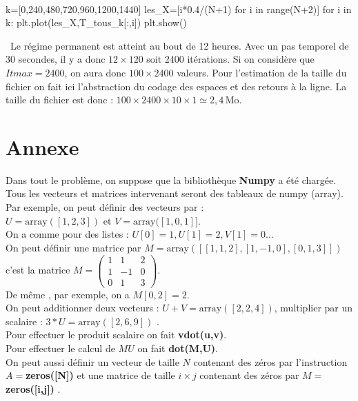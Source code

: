 \ifprof
\begin{corrige}
\question\
\begin{python}
k=[0,240,480,720,960,1200,1440]
les_X=[i*0.4/(N+1) for i in range(N+2)]
for i in k:
    plt.plot(les_X,T_tous_k[:,i])
plt.show()
\end{python}


\question\
Le régime permanent est atteint au bout de 12 heures. Avec un pas temporel de 30 secondes, il y a donc $12\times 120$ 
soit 2400 itérations. Si on considère que $Itmax=2400$, on aura donc $100 \times 2400$ valeurs. Pour l'estimation de la 
taille du fichier on fait ici l'abstraction du codage des espaces et des retours à la ligne. 
La taille du fichier est donc : $100 \times 2400 \times 10 \times 1 \simeq 2,4\, \text{Mo}$.
\end{corrige}
\else

\section{Annexe}
\noindent
Dans tout le problème, on suppose que la bibliothèque \textbf{Numpy} a été chargée.\\
Tous les vecteurs et matrices intervenant seront des tableaux de numpy (array).\\
Par exemple, on peut définir des vecteurs par :\\
 $U=\text{array}([1,2,3])$ et $V=\text{array}([1,0,1]]$.\\
On a comme pour des listes : $U[0]=1, U[1]=2, V[1]=0$...\\
On peut définir une matrice par $M=\text{array}([[1,1,2],[1,-1,0],[0,1,3]])$ c'est la matrice
 $M=\left(\begin{array}{ccc}1&1&2\\1&-1&0 \\ 0&1&3 \end{array} \right)$.\\
De même , par exemple, on a $M[0,2]=2$. \\
On peut additionner deux vecteurs : $U+V=\text{array}([2,2,4])$, multiplier par un scalaire :
$3*U=\text{array}([2,6,9])$ .\\
Pour effectuer le produit scalaire on fait \textbf{vdot(u,v)}.\\
Pour effectuer le calcul de $MU$ on fait \textbf{dot(M,U)}.\\
On peut aussi définir un vecteur de taille $N$ contenant des zéros par l'instruction 
$A=$\textbf{zeros([N])} et une matrice de taille $i\times j$ contenant des zéros par 
$M=$\textbf{zeros([i,j])} .
\fi


